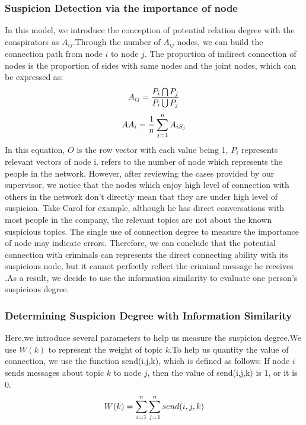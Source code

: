 \documentclass[12pt]{article}
\begin{document}
\subsubsection{Suspicion Detection via the importance of node}
	In this model, we introduce the conception of potential relation degree with the conspirators as $A_{ij}$.Through the number of $A_{ij}$ nodes, we can build the connection path from node $i$ to node $j$.
	The proportion of indirect connection of nodes is the proportion of sides with same nodes and the joint nodes, which can be expressed as:
\begin{equation}
\centering
A_{ij} = \frac{P_i \bigcap P_j}{P_i \bigcup P_j}
\end{equation}
\begin{equation}
\centering
AA_i = \frac{1}{n}\sum_{j=1}^{n}A_{iS_j}
\end{equation}
	In this equation, $O$ is the row vector with each value being 1, $P_i$ represents relevant vectors of node i.  refers to the number of node which represents the people in the network.
	However, after reviewing the cases provided by our supervisor, we notice that the nodes which enjoy high level of connection with others in the network don’t directly mean that they are under high level of suspicion. Take Carol for example, although he has direct conversations with most people in the company, the relevant topics are not about the known suspicious topics. The single use of connection degree to measure the importance of node may indicate errors. Therefore, we can conclude that the potential connection with criminals can represents the direct connecting ability with its suspicious node, but it cannot perfectly reflect the criminal message he receives .As a result, we decide to use the information similarity to evaluate one person’s suspicious degree.
	
\subsubsection{Determining Suspicion Degree with Information Similarity}

	Here,we introduce several parameters to help us measure the suspicion degree.We use $W(k)$ to represent the weight of topic $k$.To help us quantity the value of connection, we use the function send(i,j,k), which is defined as follows: If node $i$ sends messages about topic $k$ to node $j$, then the value of send(i,j,k) is 1, or it is 0.
\begin{equation}
\centering
W(k) = \sum_{i=1}^n \sum_{j=1}^n send(i,j,k)
\end{equation}
\end{document}
